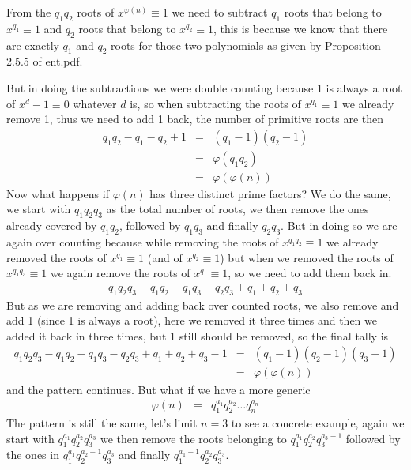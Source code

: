 \documentclass[aps,preprint,preprintnumbers,nofootinbib,showpacs,prd]{revtex4-1}
\newcommand{\nbea}{\begin{eqnarray*}}
\newcommand{\neea}{\end{eqnarray*}}
\begin{document}
From the $q_1q_2$ roots of $x^{\varphi(n)} \equiv 1$ we need to subtract $q_1$ roots that belong to $x^{q_1} \equiv 1$ and $q_2$ roots that belong to $x^{q_2} \equiv 1$, this is because we know that there are exactly $q_1$ and $q_2$ roots for those two polynomials as given by Proposition 2.5.5 of ent.pdf.

But in doing the subtractions we were double counting because 1 is always a root of $x^d - 1 \equiv 0$ whatever $d$ is, so when subtracting the roots of $x^{q_1} \equiv 1$ we already remove 1, thus we need to add 1 back, the number of primitive roots are then
%
\nbea
q_1q_2 - q_1 - q_2 + 1 & = & (q_1 - 1)(q_2 - 1) \\
& = & \varphi(q_1q_2) \\
& = & \varphi(\varphi(n))
\neea
%
Now what happens if $\varphi(n)$ has three distinct prime factors? We do the same, we start with $q_1q_2q_3$ as the total number of roots, we then remove the ones already covered by $q_1q_2$, followed by $q_1q_3$ and finally $q_2q_3$. But in doing so we are again over counting because while removing the roots of $x^{q_1q_2} \equiv 1$ we already removed the roots of $x^{q_1} \equiv 1$ (and of $x^{q_2} \equiv 1$) but when we removed the roots of $x^{q_1q_3} \equiv 1$ we again remove the roots of $x^{q_1} \equiv 1$, so we need to add them back in.
%
\nbea
q_1q_2q_3 - q_1q_2 - q_1q_3 - q_2q_3 + q_1 + q_2 + q_3
\neea
%
But as we are removing and adding back over counted roots, we also remove and add 1 (since 1 is always a root), here we removed it three times and then we added it back in three times, but 1 still should be removed, so the final tally is
%
\nbea
q_1q_2q_3 - q_1q_2 - q_1q_3 - q_2q_3 + q_1 + q_2 + q_3 - 1 & = & (q_1 - 1)(q_2 - 1)(q_3 - 1) \\
& = & \varphi(\varphi(n))
\neea
%
and the pattern continues. But what if we have a more generic
%
\nbea
\varphi(n) & = & q_1^{a_1}q_2^{a_2} \dots q_n^{a_n}
\neea
%
The pattern is still the same, let's limit $n=3$ to see a concrete example, again we start with $q_1^{a_1}q_2^{a_2}q_3^{a_3}$ we then remove the roots belonging to $q_1^{a_1}q_2^{a_2}q_3^{a_3-1}$ followed by the ones in $q_1^{a_1}q_2^{a_2-1}q_3^{a_3}$ and finally $q_1^{a_1-1}q_2^{a_2}q_3^{a_3}$.
\end{document}
